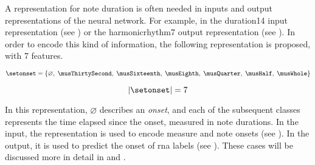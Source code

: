 
A representation for note duration is often needed in inputs
and output representations of the neural network. For
example, in the \gls{duration14} input representation (see
) or the \gls{harmonicrhythm7} output
representation (see ). In
order to encode this kind of information, the following
representation is proposed, with 7 features.

\begin{equation}
    \label{eq:onset_7}
    \setonset = \{\varnothing,\; \musThirtySecond,\; \musSixteenth,\; 
    \musEighth,\; \musQuarter,\; \musHalf,\; \musWhole \}
\end{equation}

\begin{equation}
    \label{eq:onset_7_magnitude}
    | \setonset | = 7
\end{equation}

In this representation, $\varnothing$ describes an
\emph{onset}, and each of the subsequent classes represents
the time elapsed since the onset, measured in note
durations. In the input, the representation is used to
encode measure and note onsets (see
). In the output, it is
used to predict the onset of \gls{rna} labels (see
). These cases will be
discussed more in detail in
 and
.
